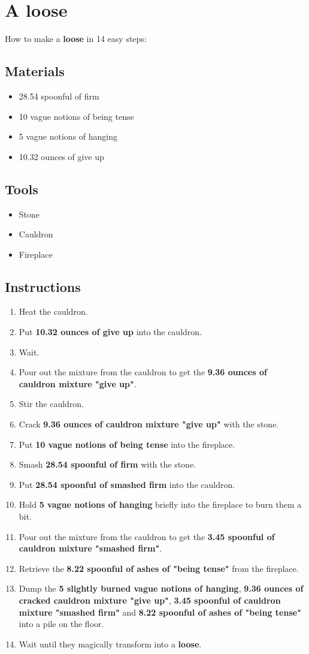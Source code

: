\documentclass{article}
\begin{document}
\section{A loose}How to make a \textbf{loose} in 14 easy steps:

\subsection{Materials}\begin{itemize}
\item 
28.54 spoonful of firm
\item 
10 vague notions of being tense
\item 
5 vague notions of hanging
\item 
10.32 ounces of give up
\end{itemize}
\subsection{Tools}\begin{itemize}
\item 
Stone
\item 
Cauldron
\item 
Fireplace
\end{itemize}
\subsection{Instructions}\begin{enumerate}
\item 
Heat the cauldron.
\item 
Put \textbf{10.32 ounces of give up} into the cauldron.
\item 
Wait.
\item 
Pour out the mixture from the cauldron to get the \textbf{9.36 ounces of cauldron mixture "give up"}.
\item 
Stir the cauldron.
\item 
Crack \textbf{9.36 ounces of cauldron mixture "give up"} with the stone.
\item 
Put \textbf{10 vague notions of being tense} into the fireplace.
\item 
Smash \textbf{28.54 spoonful of firm} with the stone.
\item 
Put \textbf{28.54 spoonful of smashed firm} into the cauldron.
\item 
Hold \textbf{5 vague notions of hanging} briefly into the fireplace to burn them a bit.
\item 
Pour out the mixture from the cauldron to get the \textbf{3.45 spoonful of cauldron mixture "smashed firm"}.
\item 
Retrieve the \textbf{8.22 spoonful of ashes of "being tense"} from the fireplace.
\item 
Dump the \textbf{5 slightly burned vague notions of hanging}, \textbf{9.36 ounces of cracked cauldron mixture "give up"}, \textbf{3.45 spoonful of cauldron mixture "smashed firm"} and \textbf{8.22 spoonful of ashes of "being tense"} into a pile on the floor.
\item 
Wait until they magically transform into a \textbf{loose}.
\end{enumerate}
\newpage
\end{document}
